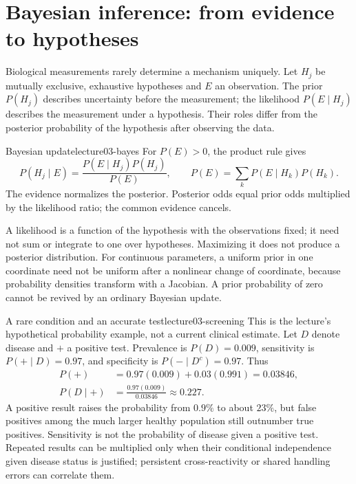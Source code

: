 \section{Bayesian inference: from evidence to hypotheses}\label{sec:lecture03-bayes}
Biological measurements rarely determine a mechanism uniquely. Let $H_j$ be mutually exclusive, exhaustive hypotheses and $E$ an observation. The prior $P(H_j)$ describes uncertainty before the measurement; the likelihood $P(E\mid H_j)$ describes the measurement under a hypothesis. Their roles differ from the posterior probability of the hypothesis after observing the data.
\begin{definition}{Bayesian update}{lecture03-bayes}
For $P(E)>0$, the product rule gives
\begin{equation}\label{eq:lecture03-bayes}
P(H_j\mid E)=\frac{P(E\mid H_j)P(H_j)}{P(E)},\qquad
P(E)=\sum_kP(E\mid H_k)P(H_k).
\end{equation}
The evidence normalizes the posterior. Posterior odds equal prior odds multiplied by the likelihood ratio; the common evidence cancels.
\end{definition}
A likelihood is a function of the hypothesis with the observations fixed; it need not sum or integrate to one over hypotheses. Maximizing it does not produce a posterior distribution. For continuous parameters, a uniform prior in one coordinate need not be uniform after a nonlinear change of coordinate, because probability densities transform with a Jacobian. A prior probability of zero cannot be revived by an ordinary Bayesian update.
\begin{example}{A rare condition and an accurate test}{lecture03-screening}
This is the lecture's hypothetical probability example, not a current clinical estimate. Let $D$ denote disease and $+$ a positive test. Prevalence is $P(D)=0.009$, sensitivity is $P(+\mid D)=0.97$, and specificity is $P(-\mid D^c)=0.97$. Thus
\begin{align}
P(+)&=0.97(0.009)+0.03(0.991)=0.03846,\label{eq:lecture03-positive}\\
P(D\mid +)&=\frac{0.97(0.009)}{0.03846}\approx0.227.\label{eq:lecture03-screening}
\end{align}
A positive result raises the probability from $0.9\%$ to about $23\%$, but false positives among the much larger healthy population still outnumber true positives. Sensitivity is not the probability of disease given a positive test. Repeated results can be multiplied only when their conditional independence given disease status is justified; persistent cross-reactivity or shared handling errors can correlate them.
\end{example}

